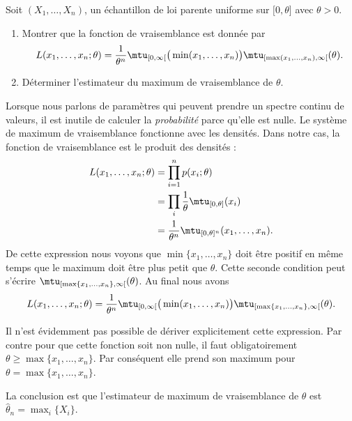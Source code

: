 \begin{example}

    Soit \( (X_1,\ldots,X_n)\), un échantillon de loi parente uniforme sur \( \mathopen[ 0 , \theta \mathclose]\) avec \( \theta>0\).

    \begin{enumerate}
        \item
            Montrer que la fonction de vraisemblance est donnée par
            \begin{equation}
                L(x_1,\ldots,x_n;\theta)=\frac{1}{ \theta^n }\mtu_{\mathopen[ 0 , \infty [}\big( \min(x_1,\ldots,x_n) \big)\mtu_{\mathopen[ \max(x_1,\ldots,x_n) , \infty [}(\theta).
            \end{equation}
            
        \item
            Déterminer l'estimateur du maximum de vraisemblance de \( \theta\).
    \end{enumerate}


    Lorsque nous parlons de paramètres qui peuvent prendre un spectre continu de valeurs, il est inutile de calculer la \emph{probabilité} parce qu'elle est nulle. Le système de maximum de vraisemblance fonctionne avec les densités. Dans notre cas, la fonction de vraisemblance est le produit des densités :
    \begin{subequations}
        \begin{align}
            L(x_1,\ldots,x_n;\theta)&=\prod_{i=1}^np(x_i;\theta)\\
            &=\prod_i\frac{1}{ \theta }\mtu_{\mathopen[ 0, \theta \mathclose]}(x_i)\\
            &=\frac{1}{ \theta^n }\mtu_{\mathopen[ 0 , \theta \mathclose]^n}(x_1,\ldots,x_n).
        \end{align}
    \end{subequations}
    De cette expression nous voyons que \( \min\{ x_1,\ldots,x_n \}\) doit être positif en même temps que le maximum doit être plus petit que \( \theta\). Cette seconde condition peut s'écrire \( \mtu_{\mathopen[ \max\{ x_1,\ldots,x_n \} , \infty [}(\theta)\). Au final nous avons
    \begin{equation}
        L(x_1,\ldots,x_n;\theta)=\frac{1}{ \theta^n }\mtu_{\mathopen[ 0 , \infty [}\big( \min(x_1,\ldots,x_n) \big)\mtu_{\mathopen[ \max\{ x_1,\ldots,x_n \} , \infty [}(\theta).
    \end{equation}
    
    Il n'est évidemment pas possible de dériver explicitement cette expression. Par contre pour que cette fonction soit non nulle, il faut obligatoirement \( \theta\geq\max\{ x_1,\ldots,x_n \}\). Par conséquent elle prend son maximum pour \( \theta=\max\{ x_1,\ldots,x_n \}\).

    La conclusion est que l'estimateur de maximum de vraisemblance de \( \theta\) est \( \hat\theta_n=\max_i\{ X_i \}\).
\end{example}

